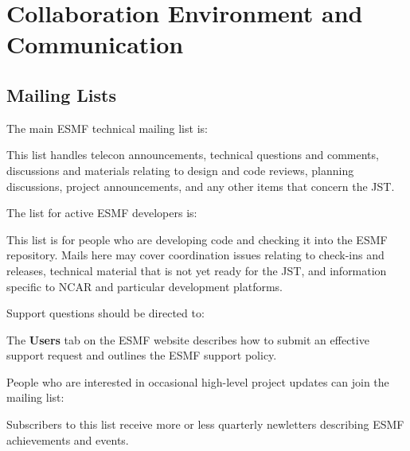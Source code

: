 
\section{Collaboration Environment and Communication}

\subsection{Mailing Lists}

The main ESMF technical mailing list is:
\begin{center}
\end{center}

This list handles telecon announcements, technical questions and
comments, discussions and materials relating to design and code
reviews, planning discussions, project announcements, and any other
items that concern the JST.

The list for active ESMF developers is:
\begin{center}
\end{center}

This list is for people who are developing code and checking
it into the ESMF repository.  Mails here may cover coordination 
issues relating to check-ins and releases, technical material that
is not yet ready for the JST, and information specific to NCAR
and particular development platforms.

Support questions should be directed to:
\begin{center}
\end{center}

The {\bf Users} tab on the ESMF website describes
how to submit an effective support request and outlines the ESMF support
policy.

People who are interested in occasional high-level project updates
can join the mailing list:
\begin{center}
\end{center}

Subscribers to this list receive more or less quarterly newletters
describing ESMF achievements and events.

